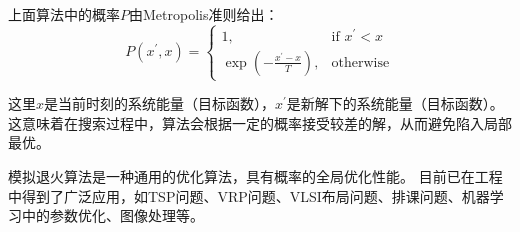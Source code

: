 \begin{itemize}
    上面算法中的概率$P$由Metropolis准则给出：
    \begin{equation}
        P(x^{\prime}, x) = \begin{cases}
            1, & \text{if } x^{\prime} < x \\
            \exp\left(-\frac{x^{\prime} - x}{T}\right), & \text{otherwise}
        \end{cases}
        \label{sec_2:sa_possibility}
    \end{equation}
    
    这里$x$是当前时刻的系统能量（目标函数），$x^{\prime}$是新解下的系统能量（目标函数）。
    这意味着在搜索过程中，算法会根据一定的概率接受较差的解，从而避免陷入局部最优。

    模拟退火算法是一种通用的优化算法，具有概率的全局优化性能。
    目前已在工程中得到了广泛应用，如TSP问题、VRP问题、VLSI布局问题、排课问题、机器学习中的参数优化、图像处理等。
\end{itemize}
